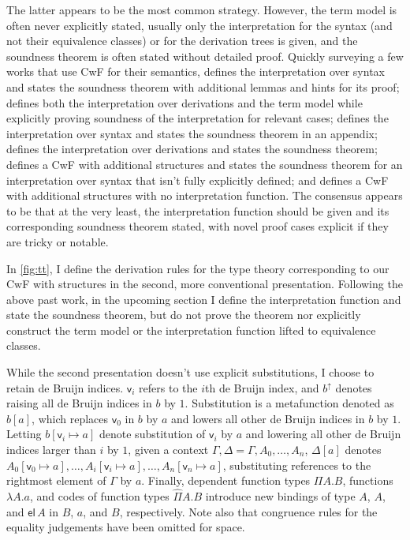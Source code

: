 \documentclass{article}
\renewcommand{\_}{\textrm{\textscale{.5}{\textunderscore}}}
\newcommand{\var}[1]{\mathsf{v}_{#1}}
\newcommand{\el}[1]{\mathsf{el}\,#1}
\theoremstyle{definition}
\theoremstyle{plain}
\begin{document}
The latter appears to be the most common strategy.
However, the term model is often never explicitly stated,
usually only the interpretation for the syntax (and not their equivalence classes)
or for the derivation trees is given,
and the soundness theorem is often stated without detailed proof.
Quickly surveying a few works that use CwF for their semantics,
\citet{synsem} defines the interpretation over syntax and states the soundness theorem
with additional lemmas and hints for its proof;
\citet{mdtt} defines both the interpretation over derivations and the term model while explicitly proving soundness of the interpretation for relevant cases;
\citet{exteq} defines the interpretation over syntax and states the soundness theorem in an appendix;
\citet{contextual} defines the interpretation over derivations and states the soundness theorem;
\citet{qtt} defines a CwF with additional structures and states the soundness theorem for an interpretation over syntax that isn't fully explicitly defined; and
\citet{relparam} defines a CwF with additional structures with no interpretation function.
The consensus appears to be that at the very least, the interpretation function should be given
and its corresponding soundness theorem stated,
with novel proof cases explicit if they are tricky or notable.

In \cref{fig:tt}, I define the derivation rules for the type theory corresponding to our CwF with structures
in the second, more conventional presentation.
Following the above past work,
in the upcoming section I define the interpretation function and state the soundness theorem,
but do not prove the theorem nor explicitly construct the term model
or the interpretation function lifted to equivalence classes.

While the second presentation doesn't use explicit substitutions,
I choose to retain de Bruijn indices.
$\var{i}$ refers to the $i$th de Bruijn index,
and $b^\uparrow$ denotes raising all de Bruijn indices in $b$ by $1$.
Substitution is a metafunction denoted as $b[a]$,
which replaces $\var{0}$ in $b$ by $a$ and lowers all other de Bruijn indices in $b$ by $1$.
Letting $b[\var{i} \mapsto a]$ denote substitution of $\var{i}$ by $a$ and lowering all other de Bruijn indices larger than $i$ by $1$,
given a context $\Gamma, \Delta = \Gamma, A_0, \dots, A_n$, $\Delta[a]$ denotes
$A_0[\var{0} \mapsto a], \dots, A_i[\var{i} \mapsto a], \dots, A_n[\var{n} \mapsto a]$,
substituting references to the rightmost element of $\Gamma$ by $a$.
Finally, dependent function types $\Pi A.B$, functions $\lambda A.a$,
and codes of function types $\widehat{\Pi} A.B$
introduce new bindings of type $A$, $A$, and $\el{A}$
in $B$, $a$, and $B$, respectively.
Note also that congruence rules for the equality judgements have been omitted for space.
\end{document}
